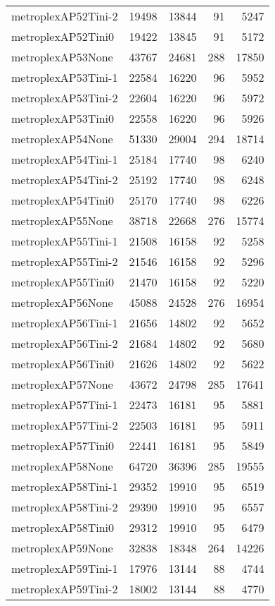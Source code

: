 \begin{longtable}{lrrrr}
metroplexAP52Tini-2 & 19498 & 13844 & 91 & 5247 \\
metroplexAP52Tini0 & 19422 & 13845 & 91 & 5172 \\
metroplexAP53None & 43767 & 24681 & 288 & 17850 \\
metroplexAP53Tini-1 & 22584 & 16220 & 96 & 5952 \\
metroplexAP53Tini-2 & 22604 & 16220 & 96 & 5972 \\
metroplexAP53Tini0 & 22558 & 16220 & 96 & 5926 \\
metroplexAP54None & 51330 & 29004 & 294 & 18714 \\
metroplexAP54Tini-1 & 25184 & 17740 & 98 & 6240 \\
metroplexAP54Tini-2 & 25192 & 17740 & 98 & 6248 \\
metroplexAP54Tini0 & 25170 & 17740 & 98 & 6226 \\
metroplexAP55None & 38718 & 22668 & 276 & 15774 \\
metroplexAP55Tini-1 & 21508 & 16158 & 92 & 5258 \\
metroplexAP55Tini-2 & 21546 & 16158 & 92 & 5296 \\
metroplexAP55Tini0 & 21470 & 16158 & 92 & 5220 \\
metroplexAP56None & 45088 & 24528 & 276 & 16954 \\
metroplexAP56Tini-1 & 21656 & 14802 & 92 & 5652 \\
metroplexAP56Tini-2 & 21684 & 14802 & 92 & 5680 \\
metroplexAP56Tini0 & 21626 & 14802 & 92 & 5622 \\
metroplexAP57None & 43672 & 24798 & 285 & 17641 \\
metroplexAP57Tini-1 & 22473 & 16181 & 95 & 5881 \\
metroplexAP57Tini-2 & 22503 & 16181 & 95 & 5911 \\
metroplexAP57Tini0 & 22441 & 16181 & 95 & 5849 \\
metroplexAP58None & 64720 & 36396 & 285 & 19555 \\
metroplexAP58Tini-1 & 29352 & 19910 & 95 & 6519 \\
metroplexAP58Tini-2 & 29390 & 19910 & 95 & 6557 \\
metroplexAP58Tini0 & 29312 & 19910 & 95 & 6479 \\
metroplexAP59None & 32838 & 18348 & 264 & 14226 \\
metroplexAP59Tini-1 & 17976 & 13144 & 88 & 4744 \\
metroplexAP59Tini-2 & 18002 & 13144 & 88 & 4770 \\

\end{longtable}
